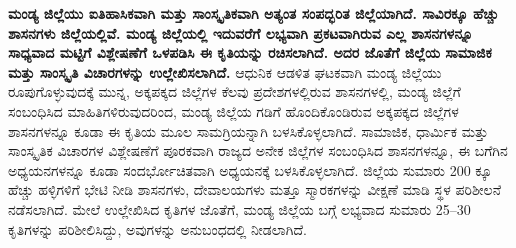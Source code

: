 \textbf{ಮಂಡ್ಯ ಜಿಲ್ಲೆಯು ಐತಿಹಾಸಿಕವಾಗಿ ಮತ್ತು ಸಾಂಸ್ಕೃತಿಕವಾಗಿ ಅತ್ಯಂತ ಸಂಪದ್ಭರಿತ ಜಿಲ್ಲೆಯಾಗಿದೆ. ಸಾವಿರಕ್ಕೂ ಹೆಚ್ಚು ಶಾಸನಗಳು ಜಿಲ್ಲೆಯಲ್ಲಿವೆ. ಮಂಡ್ಯ ಜಿಲ್ಲೆಯಲ್ಲಿ ಇದುವರೆಗೆ ಲಭ್ಯವಾಗಿ ಪ್ರಕಟವಾಗಿರುವ ಎಲ್ಲ ಶಾಸನಗಳನ್ನೂ ಸಾಧ್ಯವಾದ ಮಟ್ಟಿಗೆ ವಿಶ್ಲೇಷಣೆಗೆ ಒಳಪಡಿಸಿ ಈ ಕೃತಿಯನ್ನು ರಚಿಸಲಾಗಿದೆ. ಅದರ ಜೊತೆಗೆ ಜಿಲ್ಲೆಯ ಸಾಮಾಜಿಕ ಮತ್ತು ಸಾಂಸ್ಕೃತಿ ವಿಚಾರಗಳನ್ನು ಉಲ್ಲೇಖಿಸಲಾಗಿದೆ. } ಆಧುನಿಕ ಆಡಳಿತ ಘಟಕವಾಗಿ ಮಂಡ್ಯ ಜಿಲ್ಲೆಯು ರೂಪುಗೊಳ್ಳುವುದಕ್ಕೆ ಮುನ್ನ, ಅಕ್ಕಪಕ್ಕದ ಜಿಲ್ಲೆಗಳ ಕೆಲವು ಪ್ರದೇಶಗಳಲ್ಲಿರುವ ಶಾಸನಗಳಲ್ಲಿ, ಮಂಡ್ಯ ಜಿಲ್ಲೆಗೆ ಸಂಬಂಧಿಸಿದ ಮಾಹಿತಿಗಳಿರುವುದರಿಂದ, ಮಂಡ್ಯ ಜಿಲ್ಲೆಯ ಗಡಿಗೆ ಹೊಂದಿಕೊಂಡಿರುವ ಅಕ್ಕಪಕ್ಕದ ಜಿಲ್ಲೆಗಳ ಶಾಸನಗಳನ್ನೂ ಕೂಡಾ ಈ ಕೃತಿಯ ಮೂಲ ಸಾಮಗ್ರಿಯನ್ನಾಗಿ ಬಳಸಿಕೊಳ್ಳಲಾಗಿದೆ. ಸಾಮಾಜಿಕ, ಧಾರ್ಮಿಕ ಮತ್ತು ಸಾಂಸ್ಕೃತಿಕ ವಿಚಾರಗಳ ವಿಶ್ಲೇಷಣೆಗೆ ಪೂರಕವಾಗಿ ರಾಜ್ಯದ ಅನೇಕ ಜಿಲ್ಲೆಗಳ ಸಂಬಂಧಿಸಿದ ಶಾಸನಗಳನ್ನೂ, ಈ ಬಗೆಗಿನ ಅಧ್ಯಯನಗಳನ್ನೂ ಕೂಡಾ ಸಂದರ್ಭೋಚಿತವಾಗಿ ಅಧ್ಯಯನಕ್ಕೆ ಬಳಸಿಕೊಳ್ಳಲಾಗಿದೆ. ಜಿಲ್ಲೆಯ ಸುಮಾರು 200 ಕ್ಕೂ ಹೆಚ್ಚು ಹಳ್ಳಿಗಳಿಗೆ ಭೇಟಿ ನೀಡಿ ಶಾಸನಗಳು, ದೇವಾಲಯಗಳು ಮತ್ತೂ ಸ್ಮಾರಕಗಳನ್ನು ವೀಕ್ಷಣೆ ಮಾಡಿ ಸ್ಥಳ ಪರಿಶೀಲನೆ ನಡೆಸಲಾಗಿದೆ. ಮೇಲೆ ಉಲ್ಲೇಖಿಸಿದ ಕೃತಿಗಳ ಜೊತೆಗೆ, ಮಂಡ್ಯ ಜಿಲ್ಲೆಯ ಬಗ್ಗೆ ಲಭ್ಯವಾದ ಸುಮಾರು 25–30 ಕೃತಿಗಳನ್ನು ಪರಿಶೀಲಿಸಿದ್ದು, ಅವುಗಳನ್ನು ಅನುಬಂಧದಲ್ಲಿ ನೀಡಲಾಗಿದೆ.

\theendnotes

